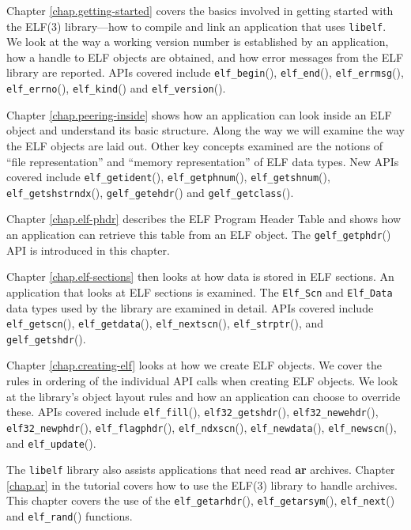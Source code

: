 \documentclass[a4paper]{report}
\newcommand{\function}[1]{\texttt{#1}()}
\newcommand{\library}[1]{\texttt{#1}}
\newcommand{\tool}[1]{\textbf{#1}}
\newcommand{\type}[1]{\texttt{#1}}
\begin{document}
Chapter \vref{chap.getting-started} covers the basics involved in
getting started with the ELF(3) library---how to compile and link an
application that uses \library{libelf}.  We look at the way a working
version number is established by an application, how a handle to ELF
objects are obtained, and how error messages from the ELF library are
reported.  APIs covered include \function{elf\_begin},
\function{elf\_end}, \function{elf\_errmsg}, \function{elf\_errno},
\function{elf\_kind} and \function{elf\_version}.

Chapter \vref{chap.peering-inside} shows how an application can look
inside an ELF object and understand its basic structure.  Along the
way we will examine the way the ELF objects are laid out.  Other key
concepts examined are the notions of ``file representation''
 and ``memory representation''
 of ELF data types.  New APIs covered
include \function{elf\_getident}, \function{elf\_getphnum},
\function{elf\_getshnum}, \function{elf\_getshstrndx},
\function{gelf\_getehdr} and \function{gelf\_getclass}.

Chapter \vref{chap.elf-phdr} describes the ELF Program Header Table and
shows how an application can retrieve this table from an ELF object.
The \function{gelf\_getphdr} API is introduced in this chapter.

Chapter \vref{chap.elf-sections} then looks at how data is stored in
ELF sections.  An application that looks at ELF sections is examined.
The \type{Elf\_Scn} and \type{Elf\_Data} data types used by the
library are examined in detail.  APIs covered include
\function{elf\_getscn}, \function{elf\_getdata},
\function{elf\_nextscn}, \function{elf\_strptr},
and \function{gelf\_getshdr}.

Chapter \vref{chap.creating-elf} looks at how we create ELF objects.
We cover the rules in ordering of the individual API calls when
creating ELF objects.  We look at the library's object layout rules
and how an application can choose to override these.  APIs covered
include \function{elf\_fill}, \function{elf32\_getshdr},
\function{elf32\_newehdr}, \function{elf32\_newphdr},
\function{elf\_flagphdr}, \function{elf\_ndxscn},
\function{elf\_newdata}, \function{elf\_newscn}, and
\function{elf\_update}.

The \library{libelf} library also assists applications that need read
\tool{ar} archives.  Chapter \vref{chap.ar} in the tutorial covers how
to use the ELF(3) library to handle archives.  This chapter covers the
use of the \function{elf\_getarhdr}, \function{elf\_getarsym},
\function{elf\_next} and \function{elf\_rand} functions.
\end{document}
